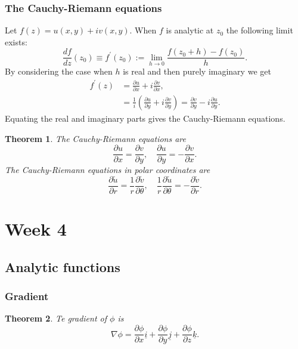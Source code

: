\documentclass{article}
\newtheorem{theorem}{Theorem}
\begin{document}
\subsubsection{The Cauchy-Riemann equations}
Let $f(z)=u(x,y)+iv(x,y)$. When $f$ is analytic at $z_0$ the following limit exists:
\begin{equation}
    \frac{df}{dz}(z_0)\equiv f^\prime(z_0):=\lim_{h\to 0}\frac{f(z_0+h)-f(z_0)}{h}.
\end{equation}
By considering the case when $h$ is real and then purely imaginary we get
\begin{align}
    f^\prime(z) &= \frac{\partial u}{\partial x}+i\frac{\partial v}{\partial x}, \\
    &= \frac{1}{i}\left( \frac{\partial u}{\partial y}+i\frac{\partial v}{\partial y} \right) = \frac{\partial v}{\partial y} -i\frac{\partial u}{\partial y}.
\end{align}
Equating the real and imaginary parts gives the Cauchy-Riemann equations.
\begin{theorem}
The Cauchy-Riemann equations are
    \begin{equation}
        \frac{\partial u}{\partial x} = \frac{\partial v}{\partial y},\quad\frac{\partial u}{\partial y}=-\frac{\partial v}{\partial x}.
    \end{equation}
    The Cauchy-Riemann equations in polar coordinates are
    \begin{equation}
        \frac{\partial \tilde{u}}{\partial r} = \frac{1}{r}\frac{\partial \tilde{v}}{\partial \theta},\quad \frac{1}{r}\frac{\partial \tilde{u}}{\partial \theta} = -\frac{\partial \tilde{v}}{\partial r}.
    \end{equation}
\end{theorem}

\section{Week 4}
\subsection{Analytic functions}
\subsubsection{Gradient}
\begin{theorem}
    Te gradient of $\phi$ is
    \begin{equation}
        \nabla\phi = \frac{\partial \phi}{\partial x}\underline{i} + \frac{\partial \phi}{\partial y}\underline{j} + \frac{\partial \phi}{\partial z}\underline{k}.
    \end{equation}
\end{theorem}
\end{document}
